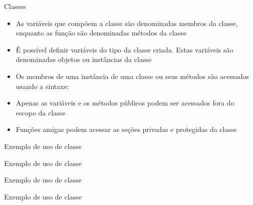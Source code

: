 \begin{frame}[fragile]{Classes}

	\begin{itemize}
		\item As variáveis que compõem a classe são denominadas membros da classe, enquanto as 
        função são denominadas métodos da classe

		\item É possível definir variáveis do tipo da classe criada. Estas variáveis são 
        denominadas objetos ou instâncias da classe

		\item Os membros de uma instância de uma classe ou seus métodos são acessados usando a
        sintaxe: 

		\item Apenas as variáveis e os métodos públicos podem ser acessados fora do escopo da 
        classe

        \item Funções amigas podem acessar as seções privadas e protegidas da classe
	\end{itemize}

\end{frame}

\begin{frame}[fragile]{Exemplo de uso de classe}
\end{frame}

\begin{frame}[fragile]{Exemplo de uso de classe}
\end{frame}

\begin{frame}[fragile]{Exemplo de uso de classe}
\end{frame}

\begin{frame}[fragile]{Exemplo de uso de classe}
\end{frame}
